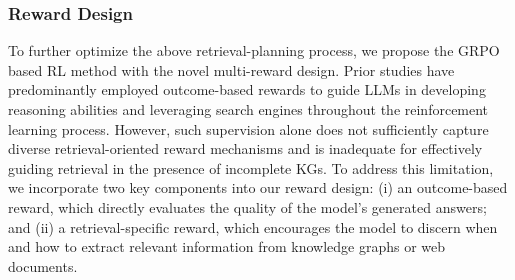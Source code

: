 \documentclass[sigconf]{acmart}
\begin{document}
\subsubsection{Reward Design}
\label{rewards}
\begin{sloppypar}
    To further optimize the above retrieval-planning process, we propose the GRPO \cite{shao2024deepseekmath} based RL method with the novel multi-reward design. Prior studies have predominantly employed outcome-based rewards to guide LLMs in developing reasoning abilities and leveraging search engines throughout the reinforcement learning process. However, such supervision alone does not sufficiently capture diverse retrieval-oriented reward mechanisms and is inadequate for effectively guiding retrieval in the presence of incomplete KGs. To address this limitation, we incorporate two key components into our reward design: (i) an outcome-based reward, which directly evaluates the quality of the model’s generated answers; and (ii) a retrieval-specific reward, which encourages the model to discern when and how to extract relevant information from knowledge graphs or web documents.
\end{sloppypar}
\end{document}
